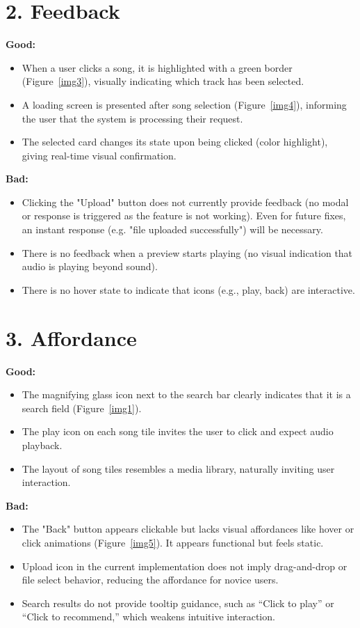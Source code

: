 \documentclass[12pt]{article}
\begin{document}
\section*{2. Feedback}

\noindent\textbf{Good:}
\begin{itemize}
    \item When a user clicks a song, it is highlighted with a green border (Figure~\ref{img3}), visually indicating which track has been selected.
    \item A loading screen is presented after song selection (Figure~\ref{img4}), informing the user that the system is processing their request.
    \item The selected card changes its state upon being clicked (color highlight), giving real-time visual confirmation.
\end{itemize}

\noindent\textbf{Bad:}
\begin{itemize}
    \item Clicking the "Upload" button does not currently provide feedback (no modal or response is triggered as the feature is not working). Even for future fixes, an instant response (e.g. "file uploaded successfully") will be necessary.
    \item There is no feedback when a preview starts playing (no visual indication that audio is playing beyond sound).
    \item There is no hover state to indicate that icons (e.g., play, back) are interactive.
\end{itemize}

\section*{3. Affordance}

\noindent\textbf{Good:}
\begin{itemize}
    \item The magnifying glass icon next to the search bar clearly indicates that it is a search field (Figure~\ref{img1}).
    \item The play icon on each song tile invites the user to click and expect audio playback.
    \item The layout of song tiles resembles a media library, naturally inviting user interaction.
\end{itemize}

\noindent\textbf{Bad:}
\begin{itemize}
    \item The "Back" button appears clickable but lacks visual affordances like hover or click animations (Figure~\ref{img5}). It appears functional but feels static.
    \item Upload icon in the current implementation does not imply drag-and-drop or file select behavior, reducing the affordance for novice users.
    \item Search results do not provide tooltip guidance, such as “Click to play” or “Click to recommend,” which weakens intuitive interaction.
\end{itemize}
\end{document}
